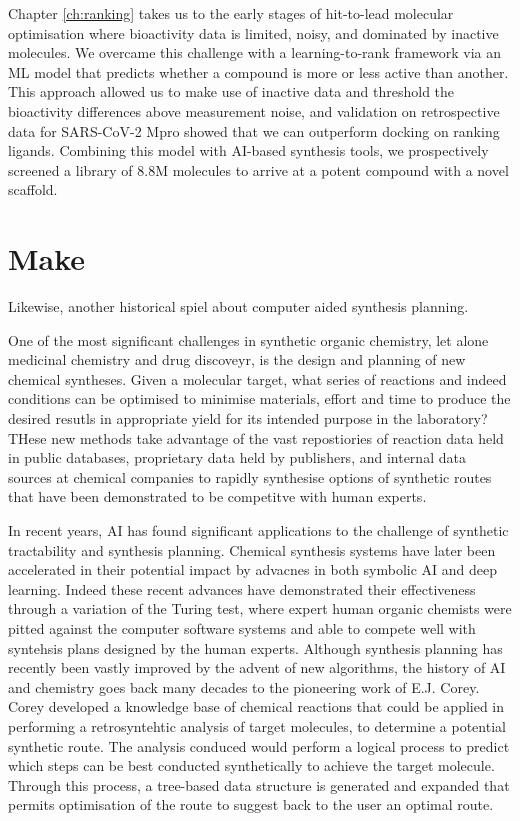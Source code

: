 Chapter \ref{ch:ranking} takes us to the early stages of hit-to-lead molecular optimisation where bioactivity data is limited, noisy, and dominated by inactive molecules. We overcame this challenge with a learning-to-rank framework via an ML model that predicts whether a compound is more or less active than another. This approach allowed us to make use of inactive data and threshold the bioactivity differences above measurement noise, and validation on retrospective data for SARS-CoV-2 Mpro showed that we can outperform docking on ranking ligands. Combining this model with AI-based synthesis tools, we prospectively screened a library of 8.8M molecules to arrive at a potent compound with a novel scaffold.

\section*{Make}
Likewise, another historical spiel about computer aided synthesis planning.

One of the most significant challenges in synthetic organic chemistry, let alone medicinal chemistry and drug discoveyr, is the design and planning of new chemical syntheses. Given a molecular target, what series of reactions and indeed conditions can be optimised to minimise materials, effort and time to produce the desired resutls in appropriate yield for its intended purpose in the laboratory? THese new methods take advantage of the vast repostiories of reaction data held in public databases, proprietary data held by publishers, and internal data sources at chemical companies to rapidly synthesise options of synthetic routes that have been demonstrated to be competitve with human experts. 

In recent years, AI has found significant applications to the challenge of synthetic tractability and synthesis planning. Chemical synthesis systems have later been accelerated in their potential impact by advacnes in both symbolic AI and deep learning. Indeed these recent advances have demonstrated their effectiveness through a variation of the Turing test, where expert human organic chemists were pitted against the computer software systems and able to compete well with syntehsis plans designed by the human experts. Although synthesis planning has recently been vastly improved by the advent of new algorithms, the history of AI and chemistry goes back many decades to the pioneering work of E.J. Corey. Corey developed a knowledge base of chemical reactions that could be applied in performing a retrosyntehtic analysis of target molecules, to determine a potential synthetic route. The analysis conduced would perform a logical process to predict which steps can be best conducted synthetically to achieve the target molecule. Through this process, a tree-based data structure is generated and expanded that permits optimisation of the route to suggest back to the user an optimal route.

